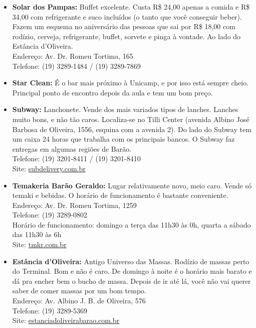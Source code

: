 \begin{itemize}
    \item   \textbf{Solar dos Pampas:} Buffet excelente. Custa R\$ 24,00 apenas
        a comida e R\$ 34,00 com refrigerante e suco incluídos (o tanto que
        você conseguir beber). Fazem um esquema no aniversário das pessoas que
        sai por R\$ 18,00 com rodízio, cerveja, refrigerante, buffet, sorvete e
        pinga à vontade. Ao lado do Estância d'Oliveira.
        \\Endereço: Av. Dr. Romeu Tortima, 165
        \\Telefone: (19) 3289-1484 / (19) 3289-7869

    \item   \textbf{Star Clean:} É o bar mais próximo à Unicamp, e por isso está
        sempre cheio. Principal ponto de encontro depois da aula e tem um bom
        preço.

    \item   \textbf{Subway:} Lanchonete. Vende dos mais variados tipos de
        lanches.  Lanches muito bons, e não tão caros. Localiza-se no Tilli
        Center (avenida Albino José Barbosa de Oliveira, 1556, esquina com a
        avenida 2). Do lado do Subway tem um caixa 24 horas que trabalha com os
        principais bancos. O Subway faz entregas em algumas regiões de Barão.
        \\Telefone: (19) 3201-8411 / (19) 3201-8410
        \\Site: \url{subdelivery.com.br}

      \item \textbf{Temakeria Barão Geraldo:} Lugar relativamente novo, meio
        caro. Vende só temaki e bebidas. O horário de funcionamento é bastante
        conveniente.
        \\Endereço: Av. Dr. Romeu Tortima, 1259
        \\Telefone: (19) 3289-0802
        \\Horário de funcionamento: domingo a terça das 11h30 às 0h, quarta a
        sábado das 11h30 às 6h
        \\Site: \url{tmkr.com.br}

    \item   \textbf{Estância d'Oliveira:} Antigo Universo das Massas. Rodízio de
        massas perto do Terminal. Bom e não é caro. De domingo à noite é o
        horário mais barato e dá pra encher bem o bucho de massa. Depois de ir
        até lá, você não vai querer saber de comer massas por um bom tempo.
        \\Endereço: Av. Albino J. B. de Oliveira, 576
        \\Telefone: (19) 3289-5369
        \\Site: \url{estanciadoliveirabarao.com.br}


\end{itemize}
